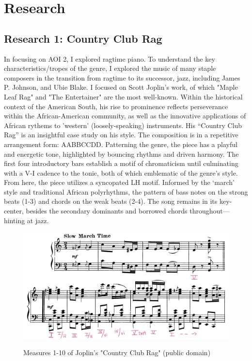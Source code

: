 \documentclass[11pt,a4paper]{article}
\begin{document}
\section{Research}

\subsection{Research 1: Country Club Rag}

In focusing on AOI 2, I explored ragtime piano. To understand the key characteristics/tropes of the genre, I explored the music of many staple composers in the transition from ragtime to its successor, jazz, including James P. Johnson, and Ubie Blake. I focused on Scott Joplin’s work, of which "Maple Leaf Rag" and "The Entertainer" are the most well-known. Within the historical context of the American South, his rise to prominence reflects perseverance within the African-American community, as well as the innovative applications of African rythems to 'western' (loosely-speaking) instruments.
His “Country Club Rag” is an insightful case study on his style. The composition is in a repetitive arrangement form: AABBCCDD. Patterning the genre, the piece has a playful and energetic tone, highlighted by bouncing rhythms and driven harmony. The first four introductory bars establish a motif of chromaticism until culminating with a V-I cadence to the tonic, both of which emblematic of the genre's style. From here, the piece utilizes a syncopated LH motif. Informed by the ‘march’ style and traditional African polyrhythms, the pattern of bass notes on the strong beats (1-3) and chords on the weak beats (2-4).  The song remains in its key-center, besides the secondary dominants and borrowed chords throughout—hinting at jazz. 
\begin{figure}[ht]
\begin{center}
\includegraphics[width=\linewidth]{country} \\
\caption{Measures 1-10 of Joplin's "Country Club Rag" (public domain)}
\label{fig:joplin}
\end{center}
\end{figure}
\end{document}
